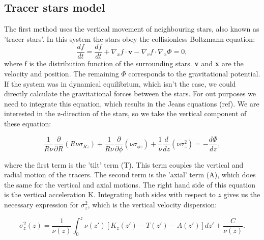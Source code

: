 \documentclass{article}
\begin{document}
\subsection{Tracer stars model}
The first method uses the vertical movement of neighbouring stars, also known as 'tracer stars'. In this system the stars obey the collisionless Boltzmann equation:
\begin{equation}
    \frac{df}{dt} = \frac{df}{dt} + \nabla_{x}f\cdot \textbf{v} - \nabla_{v}f\cdot\nabla_{x}\Phi = 0,
\end{equation}
where f is the distribution function of the surrounding stars. \textbf{v} and \textbf{x} are the velocity and position. The remaining $\Phi$ corresponds to the gravitational potential. If the system was in dynamical equilibrium, which isn't the case, we could directly calculate the gravitational forces between the stars. For out purposes we need to integrate this equation, which results in the Jeans equations (ref). We are interested in the z-direction of the stars, so we take the vertical component of these equation:

\begin{equation}
    \frac{1}{R\nu}\frac{\partial}{\partial R}(R\nu \sigma_{Rz}) + \frac{1}{R\nu}\frac{\partial}{\partial \phi}(\nu \sigma_{\phi z}) + \frac{1}{\nu}\frac{d}{dz}(\nu \sigma_{z}^{2}) = -\frac{d\Phi}{dz},
\end{equation}

where the first term is the 'tilt' term (T). This term couples the vertical and radial motion of the tracers. The second term is the 'axial' term (A), which does the same for the vertical and axial motions. The right hand side of this equation is the vertical acceleration K. Integrating both sides with respect to $z$ gives us the necessary expression for $\sigma_{z}^{2}$, which is the vertical velocity dispersion:

\begin{equation}
    \sigma_{z}^{2}(z) = \frac{1}{\nu(z)}\int_0^z\nu(z')[K_{z}(z')-T(z')-A(z')]dz' + \frac{C}{\nu(z)}. 
\end{equation}





\end{document}
